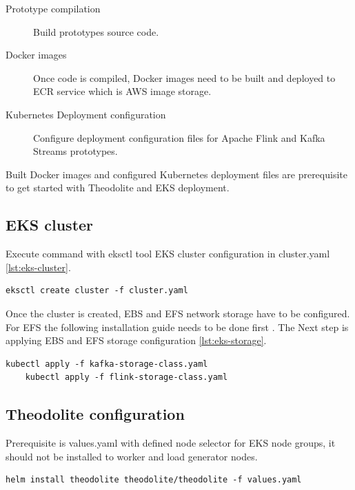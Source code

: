 \begin{description}
    \item[Prototype compilation] Build prototypes source code.
    \item[Docker images] Once code is compiled, Docker images need to be built and deployed
    to ECR \cite{awsECR} service which is AWS image storage.
    \item[Kubernetes Deployment configuration] Configure deployment configuration files for Apache Flink
    and Kafka Streams prototypes.
\end{description}

Built Docker images and configured Kubernetes deployment files are
prerequisite to get started with Theodolite and EKS deployment.

\subsection{EKS cluster}\label{subsec:eks-cluster}
Execute command with eksctl tool EKS cluster configuration in cluster.yaml  \ref{lst:eks-cluster}.

\begin{lstlisting}[label={lst:eks-cluster}]
    eksctl create cluster -f cluster.yaml
\end{lstlisting}

Once the cluster is created, EBS and EFS network storage have to be configured.
For EFS the following installation guide needs to be done first \cite{awsEfsCsi}.
The Next step is applying EBS and EFS storage configuration \ref{lst:eks-storage}.

\begin{lstlisting}[label={lst:eks-storage}]
    kubectl apply -f kafka-storage-class.yaml
    kubectl apply -f flink-storage-class.yaml
\end{lstlisting}


\subsection{Theodolite configuration}\label{subsec:theodolite-isntllation}
Prerequisite is values.yaml with defined node selector for EKS node groups,
it should not be installed to worker and load generator nodes.

\begin{lstlisting}[label={lst:theodolite-inst}]
    helm install theodolite theodolite/theodolite -f values.yaml
\end{lstlisting}

